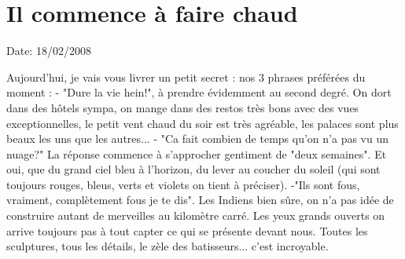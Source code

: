 \section{Il commence à faire chaud}

Date: 18/02/2008

\begin{multicols}{2}

Aujourd'hui, je vais vous livrer un petit secret : nos 3 phrases préférées du moment :
- "Dure la vie hein!", à prendre évidemment au second degré. On dort dans des hôtels sympa, on mange dans des restos très bons avec des vues exceptionnelles, le petit vent chaud du soir est très agréable, les palaces sont plus beaux les uns que les autres...
- "Ca fait combien de temps qu'on n'a pas vu un nuage?" La réponse commence à s'approcher gentiment de "deux semaines". Et oui, que du grand ciel bleu à l'horizon, du lever au coucher du soleil (qui sont toujours rouges, bleus, verts et violets on tient à préciser).
-"Ils sont fous, vraiment, complètement fous je te dis". Les Indiens bien sûre, on n'a pas idée de construire autant de merveilles au kilomètre carré. Les yeux grands ouverts on arrive toujours pas à tout capter ce qui se présente devant nous. Toutes les sculptures, tous les détails, le zèle des batisseurs... c'est incroyable.


\end{multicols}
